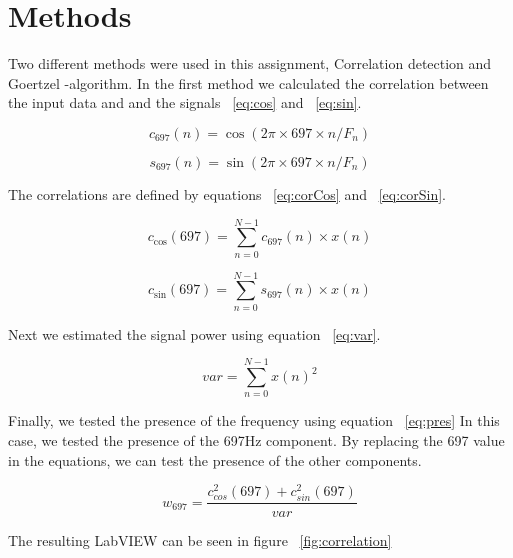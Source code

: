 \section{Methods}
 Two different methods were used in this assignment, Correlation detection and Goertzel -algorithm. In the first method we calculated the correlation between the input data and and the signals ~\ref{eq:cos} and ~\ref{eq:sin}.

\begin{equation}
  \label{eq:cos}
  c_{697}(n) = \cos(2 \pi \times 697 \times n/F_{n})
\end{equation}

\begin{equation}
  \label{eq:sin}
  s_{697}(n) = \sin(2 \pi \times 697 \times n/F_{n})
\end{equation}

The correlations are defined by equations ~\ref{eq:corCos} and ~\ref{eq:corSin}.

\begin{equation}
  \label{eq:corCos}
  c_{\cos}(697) =\sum_{n=0}^{N-1} c_{697}(n)  \times x(n)
\end{equation}

\begin{equation}
  \label{eq:corSin}
  c_{\sin}(697) =\sum_{n=0}^{N-1} s_{697}(n)  \times x(n)
\end{equation}

Next we estimated the signal power using equation ~\ref{eq:var}.

\begin{equation}
  \label{eq:var}
  var =\sum_{n=0}^{N-1}x(n)^2
\end{equation}

Finally, we tested the presence of the frequency using equation ~\ref{eq:pres} In this case, we tested the presence of the 697Hz component. By replacing the 697 value in the equations, we can test the presence of the other components.

\begin{equation}
  \label{eq:pres}
 w_{697} =\frac {c^2_{cos}(697) + c^2_{sin}(697)}{var}
\end{equation}

The resulting LabVIEW can be seen in figure ~\ref{fig:correlation}

